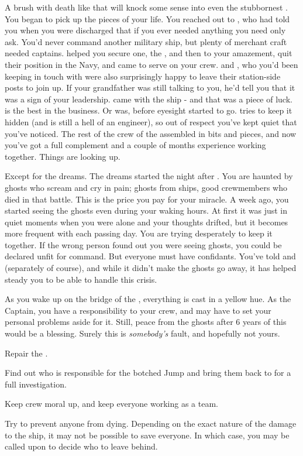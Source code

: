 \documentclass[char]{TMFHope}
\begin{document}
A brush with death like that will knock some sense into even the stubbornest \cCap{\human}. You began to pick up the pieces of your life. You reached out to \cXO{}, who had told you when you were discharged that if you ever needed anything you need only ask. You'd never command another military ship, but plenty of merchant craft needed captains. \cXO{} helped you secure one, the \pNew{}, and then to your amazement, quit their position in the Navy, and came to serve on your crew. \cMed{} and \cSci{}, who you'd been keeping in touch with were also surprisingly happy to leave their station-side posts to join up. If your grandfather was still talking to you, he'd tell you that it was a sign of your leadership. \cEng{} came with the ship - and that was a piece of luck. \cEng{\They} is the best in the business. Or was, before \cEng{\their} eyesight started to go. \cEng{} tries to keep it hidden (and \cEng{\they} is still a hell of an engineer), so out of respect you've kept quiet that you've noticed. The rest of the crew of the \pNew{} assembled in bits and pieces, and now you've got a full complement and a couple of months experience working together. Things are looking up.

Except for the dreams. The dreams started the night after \pBattle{}. You are haunted by ghosts who scream and cry in pain; ghosts from \pPlan{} ships, good crewmembers who died in that battle. This is the price you pay for your miracle.	A week ago, you started seeing the ghosts even during your waking hours. At first it was just in quiet moments when you were alone and your thoughts drifted, but it becomes more frequent with each passing day. You are trying desperately to keep it together. If the wrong person found out you were seeing ghosts, you could be declared unfit for command. But everyone must have confidants. You've told \cMed{} and \cSci{} (separately of course), and while it didn't make the ghosts go away, it has helped steady you to be able to handle this crisis. 

As you wake up on the bridge of the \pNew{}, everything is cast in a yellow hue. As the Captain, you have a responsibility to your crew, and may have to set your personal problems aside for it. Still, peace from the ghosts after 6 years of this would be a blessing. Surely this is \emph{somebody's} fault, and hopefully not yours. 

\begin{itemz}[Goals]
	\item Repair the \pNew{}.
	\item Find out who is responsible for the botched Jump and bring them back to \pHome{} for a full investigation.
	\item Keep crew moral up, and keep everyone working as a team.
	\item Try to prevent anyone from dying. Depending on the exact nature of the damage to the ship, it may not be possible to save everyone. In which case, you may be called upon to decide who to leave behind.
\end{itemz}
\end{document}
